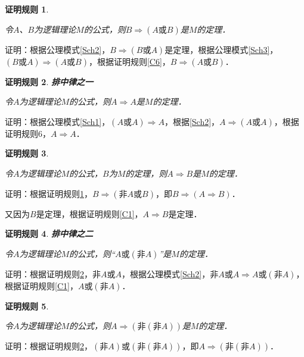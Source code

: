 \documentclass[12pt, a4paper, oneside]{book}
\newtheorem{C}{证明规则}
\begin{document}
			\begin{C}\label{C7}	
				\hfill\par
				令$A$、$B$为逻辑理论$M$的公式，则$B\Rightarrow (A\text{或}B)$是$M$的定理．
			\end{C}
			证明：根据公理模式\ref{Sch2}，$B\Rightarrow (B\text{或}A)$是定理，根据公理模式\ref{Sch3}，$(B\text{或}A)\Rightarrow (A\text{或}B)$，根据证明规则\ref{C6}，$B\Rightarrow (A\text{或}B)$．

			\begin{C}\label{C8}				
				\textbf{排中律之一}
				\par
				令$A$为逻辑理论$M$的公式，则$A\Rightarrow A$是$M$的定理．
			\end{C}
			证明：根据公理模式\ref{Sch1}，$(A\text{或}A)\Rightarrow A$，根据\ref{Sch2}，$A\Rightarrow(A\text{或}A)$，根据证明规则6，$A\Rightarrow A$．
			
			\begin{C}\label{C9}				
				\hfill\par
				令$A$为逻辑理论$M$的公式，$B$为$M$的定理，则$A\Rightarrow B$是$M$的定理．
			\end{C}
			证明：根据证明规则\ref{C7}，$B\Rightarrow (\text{非}A\text{或}B)$，即$B\Rightarrow (A\Rightarrow B)$．
			\par
			又因为$B$是定理，根据证明规则\ref{C1}，$A\Rightarrow B$是定理．

			\begin{C}\label{C10}				
				\textbf{排中律之二}
				\par
				令$A$为逻辑理论$M$的公式，则“$A\text{或}(\text{非}A)$”是$M$的定理．
			\end{C}
			证明：根据证明规则\ref{C8}，$\text{非}A\text{或}A$，根据公理模式\ref{Sch2}，$\text{非}A\text{或}A\Rightarrow A\text{或}(\text{非}A)$，根据证明规则\ref{C1}，$A\text{或}(\text{非}A)$．
			
			\begin{C}\label{C11}				
				\hfill\par
				令$A$为逻辑理论$M$的公式，则$A\Rightarrow(\text{非}(\text{非}A))$是$M$的定理．
			\end{C}
			证明：根据证明规则\ref{C8}，$(\text{非}A)\text{或}(\text{非}(\text{非}A))$，即$A\Rightarrow (\text{非}(\text{非}A))$．
\end{document}
